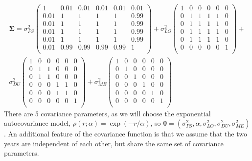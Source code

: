 \documentclass[12pt, titlepage]{article}
\begin{document}
$$
\begin{array}{c}
\boldsymbol{\Sigma} = \sigma^{2}_{PS}\left(
\begin{array}{cccccc}
	1 & 0.01 & 0.01 & 0.01 & 0.01 & 0.01 \\
	0.01 & 1 & 1 & 1 & 1 & 0.99 \\
	0.01 & 1 & 1 & 1 & 1 & 0.99 \\
	0.01 & 1 & 1 & 1 & 1 & 0.99 \\
	0.01 & 1 & 1 & 1 & 1 & 0.99 \\
	0.01 & 0.99 & 0.99 & 0.99 & 0.99 & 1 \\
\end{array}
\right) + 
\sigma^{2}_{LO}\left(
\begin{array}{cccccc}
	1 & 0 & 0 & 0 & 0 & 0 \\
	0 & 1 & 1 & 1 & 1 & 0 \\
	0 & 1 & 1 & 1 & 1 & 0 \\
	0 & 1 & 1 & 1 & 1 & 0 \\
	0 & 1 & 1 & 1 & 1 & 0 \\
	0 & 0 & 0 & 0 & 0 & 1 \\
\end{array}
\right) + \\
\sigma^{2}_{DU}\left(
\begin{array}{cccccc}
	1 & 0 & 0 & 0 & 0 & 0 \\
	0 & 1 & 1 & 0 & 0 & 0 \\
	0 & 1 & 1 & 0 & 0 & 0 \\
	0 & 0 & 0 & 1 & 1 & 0 \\
	0 & 0 & 0 & 1 & 1 & 0 \\
	0 & 0 & 0 & 0 & 0 & 1 \\
\end{array}
\right) + 
\sigma^{2}_{ME}\left(
\begin{array}{cccccc}
	1 & 0 & 0 & 0 & 0 & 0 \\
	0 & 1 & 0 & 0 & 0 & 0 \\
	0 & 0 & 1 & 0 & 0 & 0 \\
	0 & 0 & 0 & 1 & 0 & 0 \\
	0 & 0 & 0 & 0 & 1 & 0 \\
	0 & 0 & 0 & 0 & 0 & 1 \\
\end{array}
\right)
\end{array}
$$
There are 5 covariance parameters, as we will choose the exponential autocovariance model, $\rho(r;\alpha) = \exp(-r/\alpha)$, so $\boldsymbol{\theta} = (\sigma^{2}_{PS},\alpha, \sigma^{2}_{LO},\sigma^{2}_{DU},\sigma^{2}_{ME})$.  An additional feature of the covariance function is that we assume that the two years are independent of each other, but share the same set of covariance parameters.
\end{document}
